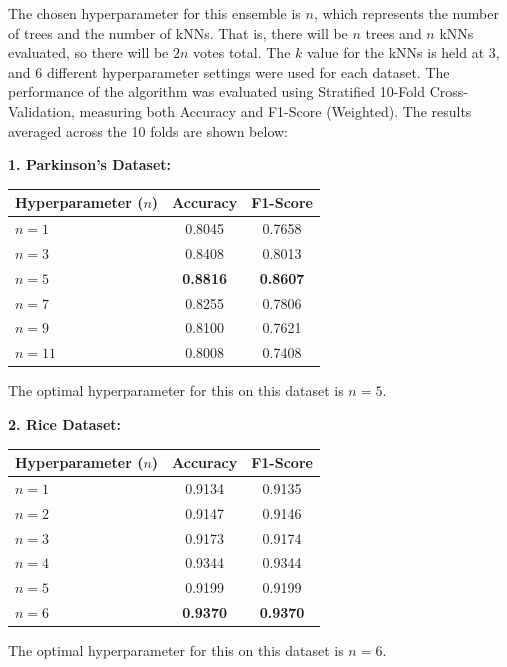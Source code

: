 \documentclass{article}
\begin{document}
The chosen hyperparameter for this ensemble is $n$, which represents the number of trees and the number of kNNs.
That is, there will be $n$ trees and $n$ kNNs evaluated, so there will be $2n$ votes total. 
The $k$ value for the kNNs is held at 3, and 6 different hyperparameter settings were used for each dataset. 
The performance of the algorithm was evaluated using Stratified 10-Fold Cross-Validation, measuring both Accuracy and F1-Score (Weighted).
The results averaged across the 10 folds are shown below: 

\vspace{0.25cm}
\textbf{1. Parkinson's Dataset:}
\begin{table}[H]
\centering
\begin{tabular}{|l|c|c|}
\hline
\textbf{Hyperparameter ($n$)} & \textbf{Accuracy} & \textbf{F1-Score} \\ \hline
$n = 1$ & 0.8045 & 0.7658 \\ \hline
$n = 3$ & 0.8408 & 0.8013 \\ \hline
$n = 5$ & \textbf{0.8816} & \textbf{0.8607} \\ \hline
$n = 7$ & 0.8255 & 0.7806 \\ \hline
$n = 9$ & 0.8100 & 0.7621 \\ \hline
$n = 11$ & 0.8008 & 0.7408 \\ \hline
\end{tabular}
\end{table}
\noindent The optimal hyperparameter for this on this dataset is $n=5$.

\vspace{0.25cm}
\textbf{2. Rice Dataset:}
\begin{table}[H]
\centering
\begin{tabular}{|l|c|c|}
\hline
\textbf{Hyperparameter ($n$)} & \textbf{Accuracy} & \textbf{F1-Score} \\ \hline
$n = 1$ & 0.9134 & 0.9135 \\ \hline
$n = 2$ & 0.9147 & 0.9146 \\ \hline
$n = 3$ & 0.9173 & 0.9174 \\ \hline
$n = 4$ & 0.9344 & 0.9344 \\ \hline
$n = 5$ & 0.9199 & 0.9199 \\ \hline
$n = 6$ & \textbf{0.9370} & \textbf{0.9370} \\ \hline
\end{tabular}
\end{table}
\noindent The optimal hyperparameter for this on this dataset is $n=6$.
\end{document}

